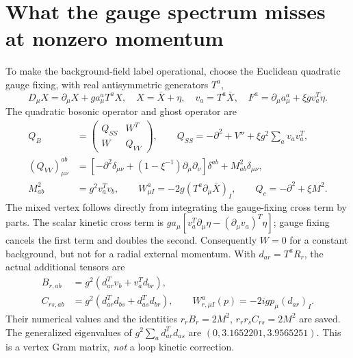 \documentclass[11pt]{article}
\begin{document}
\section{What the gauge spectrum misses at nonzero momentum}
To make the background-field label operational, choose the Euclidean
quadratic gauge fixing, with real antisymmetric generators $T^a$,
\begin{equation}
 D_\mu X=\partial_\mu X+g a_\mu^aT^aX,\quad
 X=\bar X+\eta,\quad v_a=T^a\bar X,\quad
 F^a=\partial_\mu a_\mu^a+\xi g v_a^T\eta.
\end{equation}
The quadratic bosonic operator and ghost operator are
\begin{align}
 Q_B&=\begin{pmatrix}Q_{SS}&W^T\\W&Q_{VV}\end{pmatrix},\qquad
 Q_{SS}=-\partial^2+V''+\xi g^2\sum_a v_av_a^T,\\
 (Q_{VV})^{ab}_{\mu\nu}&=
 [-\partial^2\delta_{\mu\nu}+(1-\xi^{-1})\partial_\mu\partial_\nu]\delta^{ab}
 +M_{ab}^2\delta_{\mu\nu},\\
 M_{ab}^2&=g^2v_a^Tv_b,\qquad
 W^a_{\mu I}=-2g(T^a\partial_\mu\bar X)_I,\qquad
 Q_c=-\partial^2+\xi M^2.
\end{align}
The mixed vertex follows directly from integrating the gauge-fixing
cross term by parts. The scalar kinetic cross term is
$g a_\mu[v_a^T\partial_\mu\eta-(\partial_\mu v_a)^T\eta]$;
gauge fixing cancels the first term and doubles the second. Consequently
$W=0$ for a constant background, but not for a radial external momentum.
With $d_{ar}=T^aR_r$, the actual additional tensors are
\begin{align}
 B_{r,ab}&=g^2(d_{ar}^Tv_b+v_a^Td_{br}),\\
 C_{rs,ab}&=g^2(d_{ar}^Td_{bs}+d_{as}^Td_{br}),\qquad
 W^a_{r,\mu I}(p)=-2igp_\mu(d_{ar})_I.
\end{align}
Their numerical values and the identities
$r_rB_r=2M^2$, $r_rr_sC_{rs}=2M^2$ are saved. The generalized eigenvalues
of $g^2\sum_a d_{ar}^Td_{as}$ are $(0,3.1652201,3.9565251)$.
This is a vertex Gram matrix, \emph{not} a loop kinetic correction.
\end{document}
